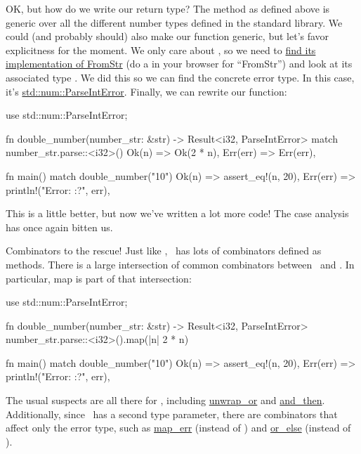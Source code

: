 \blank

OK, but how do we write our return type? The  method as defined above is generic over all the different number 
types defined in the standard library. We could (and probably should) also make our function generic, but let's favor 
explicitness for the moment. We only care about \itt, so we need to 
\href{https://doc.rust-lang.org/std/primitive.i32.html}{find its implementation of FromStr} (do a  in your 
browser for \enquote{FromStr}) and look at its associated type . We did this so we can find the concrete error type. 
In this case, it's \href{https://doc.rust-lang.org/std/num/struct.ParseIntError.html}{std::num::ParseIntError}. Finally, 
we can rewrite our function:

\begin{rustc}
use std::num::ParseIntError;

fn double_number(number_str: &str) -> Result<i32, ParseIntError> {
    match number_str.parse::<i32>() {
        Ok(n) => Ok(2 * n),
        Err(err) => Err(err),
    }
}

fn main() {
    match double_number("10") {
        Ok(n) => assert_eq!(n, 20),
        Err(err) => println!("Error: {:?}", err),
    }
}
\end{rustc}

This is a little better, but now we've written a lot more code! The case analysis has once again bitten us.

\blank

Combinators to the rescue! Just like \option, \result\ has lots of combinators defined as methods. There is 
a large intersection of common combinators between \result\ and \option. In particular, map is part of that 
intersection:

\begin{rustc}
use std::num::ParseIntError;

fn double_number(number_str: &str) -> Result<i32, ParseIntError> {
    number_str.parse::<i32>().map(|n| 2 * n)
}

fn main() {
    match double_number("10") {
        Ok(n) => assert_eq!(n, 20),
        Err(err) => println!("Error: {:?}", err),
    }
}
\end{rustc}

The usual suspects are all there for \result, including 
\href{https://doc.rust-lang.org/std/result/enum.Result.html\#method.unwrap\_or}{unwrap\_or} and 
\href{https://doc.rust-lang.org/std/result/enum.Result.html\#method.and\_then}{and\_then}. Additionally, since \result\ 
has a second type parameter, there are combinators that affect only the error type, such as 
\href{https://doc.rust-lang.org/std/result/enum.Result.html\#method.map\_err}{map\_err} (instead of ) and 
\href{https://doc.rust-lang.org/std/result/enum.Result.html\#method.or\_else}{or\_else} (instead of \code{and\_then}).

